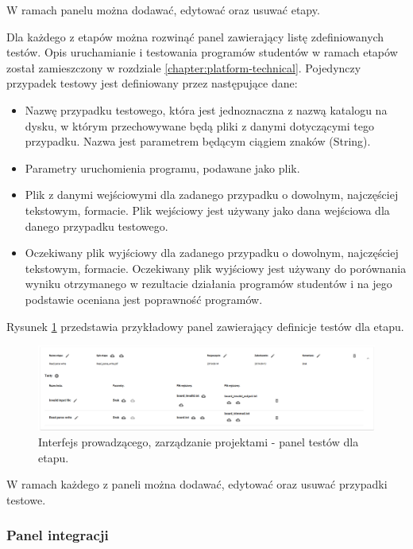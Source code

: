 W ramach panelu można dodawać, edytować oraz usuwać etapy.


Dla każdego z etapów można rozwinąć panel zawierający listę zdefiniowanych testów.
Opis uruchamianie i testowania programów studentów w ramach etapów został zamieszczony w rozdziale \ref{chapter:platform-technical}.
Pojedynczy przypadek testowy jest definiowany przez następujące dane:
\begin {itemize}
    \item Nazwę przypadku testowego, która jest jednoznaczna z nazwą katalogu na dysku, w którym przechowywane będą pliki z danymi dotyczącymi tego przypadku.
    Nazwa jest parametrem będącym ciągiem znaków (String).
    \item Parametry uruchomienia programu, podawane jako plik.
    \item Plik z danymi wejściowymi dla zadanego przypadku o dowolnym, najczęściej tekstowym, formacie.
    Plik wejściowy jest używany jako dana wejściowa dla danego przypadku testowego.
    \item Oczekiwany plik wyjściowy dla zadanego przypadku o dowolnym, najczęściej tekstowym, formacie.
    Oczekiwany plik wyjściowy jest używany do porównania wyniku otrzymanego w rezultacie działania programów studentów i na jego podstawie oceniana jest poprawność programów.
\end {itemize}

Rysunek \ref{fig:lecturer_stages_tests} przedstawia przykładowy panel zawierający definicje testów dla etapu.

\begin{figure}[h]
    \centering
    \includegraphics[width = 15cm]{chapter04/lecturer_stages_tests.png}
    \caption{Interfejs prowadzącego, zarządzanie projektami - panel testów dla etapu.}
    \label{fig:lecturer_stages_tests}
\end{figure}

W ramach każdego z paneli można dodawać, edytować oraz usuwać przypadki testowe.

\subsubsection{Panel integracji}

